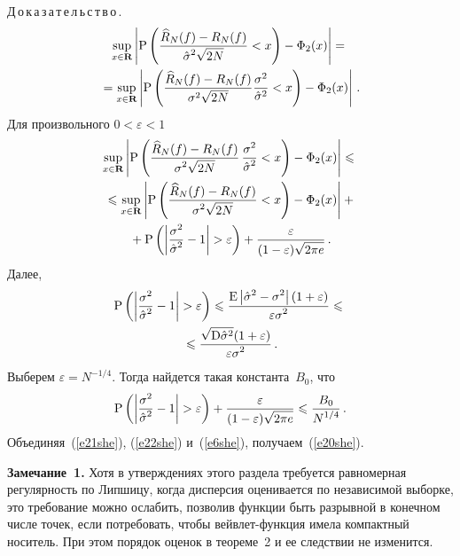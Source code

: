 \begin{multicols}{2}
\noindent
Д\,о\,к\,а\,з\,а\,т\,е\,л\,ь\,с\,т\,в\,о\,.\ 
\begin{multline*}
\sup\limits_{x\in\mathbf{R}}
\left\vert\mbox{P}\left(\displaystyle\frac{\displaystyle \widehat{R}_N(f)-R_N(f)\mathstrut}{\displaystyle \hat{\sigma}^2\sqrt{2N}\mathstrut}<x\right)-\Phi_2(x)\right\vert={}\\
{}=\sup\limits_{x\in\mathbf{R}}
\left\vert\mbox{P}\left(\frac{\widehat{R}_N(f)-R_N(f)}{\sigma^{2}\sqrt{2N}}\frac{\sigma^{2}}{\hat{\sigma}^2}<x\right)-\Phi_2(x)\right\vert\,.
\end{multline*}
Для произвольного $0<\varepsilon<1$
\begin{multline}
\sup\limits_{x\in\mathbf{R}}\left\vert\mbox{P}\left(\displaystyle\frac{\displaystyle \widehat{R}_N(f)-R_N(f)\mathstrut}{\displaystyle \sigma^{2}\sqrt{2N}\mathstrut}\,
\displaystyle\frac{\displaystyle \sigma^{2}\mathstrut}{\displaystyle \hat{\sigma}^2\mathstrut}<x\right)-\Phi_2(x)\right\vert\leqslant{}\\
{}\leqslant\sup\limits_{x\in\mathbf{R}}\left\vert\mbox{P}\left(\displaystyle\frac{\displaystyle \widehat{R}_N(f)-R_N(f)\mathstrut}{\displaystyle \sigma^{2}\sqrt{2N}\mathstrut}<x\right)-\Phi_2(x)\right\vert+{}\\
{}+\mbox{P}\left(\left\vert\displaystyle\frac{\displaystyle \sigma^{2}\mathstrut}{\displaystyle \hat{\sigma}^2\mathstrut}-1\right\vert>\varepsilon\right)+
\displaystyle\frac{\displaystyle \varepsilon\mathstrut}{\displaystyle (1-\varepsilon)\sqrt{2\pi e}\mathstrut}\,.
\label{e21she}
\end{multline}
Далее,
\begin{multline*}
\mbox{P}\left(\left\vert\displaystyle\frac{\displaystyle \sigma^{2}\mathstrut}{\displaystyle \hat{\sigma}^2\mathstrut}-1\right\vert>\varepsilon\right)\leqslant
\displaystyle\frac{\displaystyle \mbox{E}\left\vert\hat{\sigma}^2-\sigma^{2}\right\vert(1+\varepsilon)\mathstrut}{\displaystyle \varepsilon\sigma^2\mathstrut}\leqslant{}\\
{}\leqslant
\displaystyle\frac{\displaystyle \sqrt{\mbox{D}\hat{\sigma}^2}(1+\varepsilon)\mathstrut}{\displaystyle \varepsilon\sigma^2\mathstrut}\,.
\end{multline*}
Выберем $\varepsilon=N^{-1/4}$. Тогда найдется такая константа~$B_0$, что
\begin{equation}
\mbox{P}\left(\left\vert\displaystyle\frac{\displaystyle \sigma^{2}\mathstrut}{\displaystyle \hat{\sigma}^2\mathstrut}-1\right\vert>\varepsilon\right)+
\displaystyle\frac{\displaystyle \varepsilon\mathstrut}{\displaystyle (1-\varepsilon)\sqrt{2\pi e}\mathstrut}\leqslant\displaystyle\frac{\displaystyle B_0\mathstrut}{\displaystyle N^{1/4}\mathstrut}\,.
\label{e22she}
\end{equation}
Объединяя~(\ref{e21she}), (\ref{e22she}) и~(\ref{e6she}), получаем~(\ref{e20she}).

\medskip

\noindent
\textbf{Замечание~1.} Хотя в утверждениях этого раздела требуется равномерная регулярность по 
Липшицу, когда дисперсия оценивается по независимой выборке, это требование можно ослабить, 
позволив функции быть разрывной в конечном числе точек, если потребовать, чтобы вейвлет-функция 
имела компактный носитель. При этом порядок оценок в теореме~2 и ее следствии не изменится.


\end{multicols}
